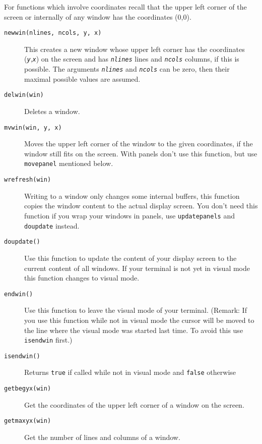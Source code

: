 \documentclass[a4paper,11pt]{report}
\begin{document}
{{{ For functions which involve coordinates recall that the upper left corner of
the screen or internally of any window has the coordinates (0,0). 
\begin{description}
\item[{\texttt{newwin(nlines, ncols, y, x)}}] This creates a new window whose upper left corner has the coordinates (\mbox{\texttt{\mdseries\slshape y}},\mbox{\texttt{\mdseries\slshape x}}) on the screen and has \mbox{\texttt{\mdseries\slshape nlines}} lines and \mbox{\texttt{\mdseries\slshape ncols}} columns, if this is possible. The arguments \mbox{\texttt{\mdseries\slshape nlines}} and \mbox{\texttt{\mdseries\slshape ncols}} can be zero, then their maximal possible values are assumed.
\item[{\texttt{delwin(win)}}] Deletes a window.
\item[{\texttt{mvwin(win, y, x)}}] Moves the upper left corner of the window to the given coordinates, if the
window still fits on the screen. With panels don't use this function, but use \texttt{move{\textunderscore}panel} mentioned below.
\item[{\texttt{wrefresh(win)}}] Writing to a window only changes some internal buffers, this function copies
the window content to the actual display screen. You don't need this function
if you wrap your windows in panels, use \texttt{update{\textunderscore}panels} and \texttt{doupdate} instead.
\item[{\texttt{doupdate()}}] Use this function to update the content of your display screen to the current
content of all windows. If your terminal is not yet in visual mode this
function changes to visual mode.
\item[{\texttt{endwin()}}] Use this function to leave the visual mode of your terminal. (Remark: If you
use this function while not in visual mode the cursor will be moved to the
line where the visual mode was started last time. To avoid this use \texttt{isendwin} first.)
\item[{\texttt{isendwin()}}] Returns \texttt{true} if called while not in visual mode and \texttt{false} otherwise
\item[{\texttt{getbegyx(win)}}] Get the coordinates of the upper left corner of a window on the screen.
\item[{\texttt{getmaxyx(win)}}] Get the number of lines and columns of a window.
\end{description}
 }

}}
\end{document}
